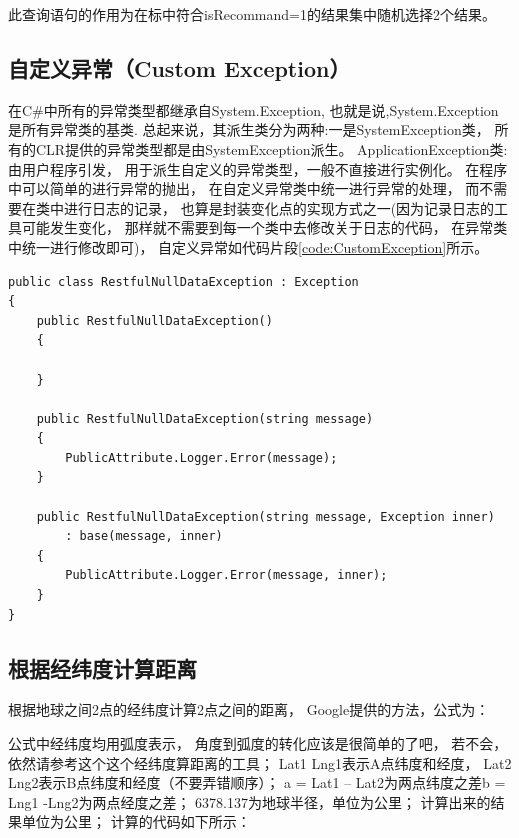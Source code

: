 \documentclass{book}
\begin{document}
此查询语句的作用为在标中符合isRecommand=1的结果集中随机选择2个结果。

\subsection{自定义异常（Custom Exception）}

在C\#中所有的异常类型都继承自System.Exception,
也就是说,System.Exception是所有异常类的基类. 
总起来说，其派生类分为两种:一是SystemException类，
所有的CLR提供的异常类型都是由SystemException派生。
ApplicationException类: 由用户程序引发，
用于派生自定义的异常类型，一般不直接进行实例化。
在程序中可以简单的进行异常的抛出，
在自定义异常类中统一进行异常的处理，
而不需要在类中进行日志的记录，
也算是封装变化点的实现方式之一(因为记录日志的工具可能发生变化，
那样就不需要到每一个类中去修改关于日志的代码，
在异常类中统一进行修改即可)，
自定义异常如代码片段\ref{code:CustomException}所示。

\begin{lstlisting}[language={[Sharp]C},caption=自定义异常,label={code:CustomException}]
public class RestfulNullDataException : Exception
{
    public RestfulNullDataException()
    {

    }

    public RestfulNullDataException(string message)
    {
        PublicAttribute.Logger.Error(message);
    }

    public RestfulNullDataException(string message, Exception inner)
        : base(message, inner)
    {
        PublicAttribute.Logger.Error(message, inner);
    }
}
\end{lstlisting}


\subsection{根据经纬度计算距离}

根据地球之间2点的经纬度计算2点之间的距离，
Google提供的方法，公式为：

\begin{quotation}
\end{quotation}

公式中经纬度均用弧度表示，
角度到弧度的转化应该是很简单的了吧，
若不会，依然请参考这个这个经纬度算距离的工具；
Lat1 Lng1表示A点纬度和经度，
Lat2 Lng2表示B点纬度和经度（不要弄错顺序）；
a = Lat1 – Lat2为两点纬度之差b = Lng1 -Lng2为两点经度之差；
6378.137为地球半径，单位为公里；
计算出来的结果单位为公里；
计算的代码如下所示：
\end{document}
